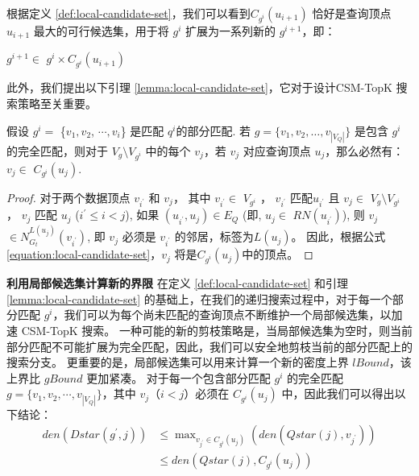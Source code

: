 根据定义 \ref{def:local-candidate-set}，我们可以看到$C_{g^i}(u_{i+1})$ 恰好是查询顶点 $u_{i+1}$ 最大的可行候选集，用于将 $g^i$ 扩展为一系列新的 $g^{i+1}$，即：

$g^{i+1}\in$ $g^i\times C_{g^i}(u_{i+1})$

此外，我们提出以下引理 \ref{lemma:local-candidate-set}，它对于设计CSM-TopK 搜索策略至关重要。

\begin{lemma} \label{lemma:local-candidate-set}
    假设 $g^i=$ \{$v_1, v_2$, $\cdots, v_i$\} 是匹配 $q^i$的部分匹配.
    若 $g=\{v_1, v_2, \dots, v_{|V_Q|}\}$ 是包含 $g^i$ 的完全匹配，则对于 $V_g\setminus V_{g^i}$ 中的每个 $v_j$，若 $v_j$ 对应查询顶点 $u_j$，那么必然有：
       $v_j\in$ $C_{g^i}(u_j)$.
    \end{lemma}

\begin{proof}
        对于两个数据顶点 $v_{i^\prime}$ 和 $v_j$， 其中 $v_{i^\prime}\in$ $V_{g^i}$ ，  $v_{i^\prime}$ 匹配$u_{i^\prime}$ 
            且 $v_{j}\in$ $V_{g}\setminus V_{g^i}$ ， $v_{j}$ 匹配 $u_j$ ($i^\prime\leq i<j$), 
            如果 $(u_{i^\prime}, u_j)\in E_Q$ (即, $u_j\in$ $RN(u_{i^\prime})$), 则 $v_j$ $\in N_{G_t}^{L(u_j)}(v_{i^\prime})$, 即 $v_j$ 必须是 $v_{i^\prime}$ 的邻居，标签为$L(u_j)$。
            因此，根据公式\ref{equation:local-candidate-set}，$v_j$ 将是$C_{g^i}(u_j)$中的顶点。
\end{proof}

\textbf{利用局部候选集计算新的界限}
在定义 \ref{def:local-candidate-set} 和引理 \ref{lemma:local-candidate-set} 的基础上，在我们的递归搜索过程中，对于每一个部分匹配 $g^i$，我们可以为每个尚未匹配的查询顶点不断维护一个局部候选集，以加速 CSM-TopK 搜索。
一种可能的新的剪枝策略是，当局部候选集为空时，则当前部分匹配不可能扩展为完全匹配，因此，我们可以安全地剪枝当前的部分匹配上的搜索分支。
更重要的是，局部候选集可以用来计算一个新的密度上界 $lBound$，该上界比 $gBound$ 更加紧凑。
对于每一个包含部分匹配 $g^i$ 的完全匹配 $g=\{v_1, v_2, \cdots, v_{|V_Q|}\}$，其中 $v_j$（$i < j$）必须在 $C_{g^i}(u_j)$ 中，因此我们可以得出以下结论：
\begin{equation*}
    \begin{aligned}
      den(Dstar(g^\prime, j)) & \leq \max\nolimits_{v_{j^\prime}\in C_{g^i}(u_j)}\left(den(Qstar(j), v_{j^\prime})\right) \\
        & \leq den(Qstar(j), C_{g^i}(u_j))
    \end{aligned}
\end{equation*}


